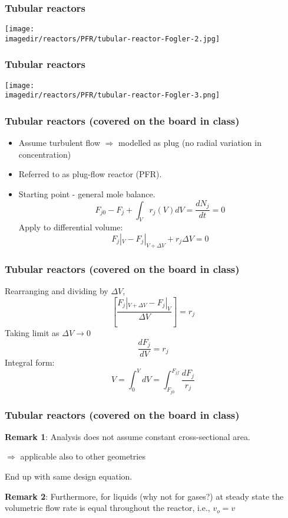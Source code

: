 \begin{frame}\frametitle{Tubular reactors}
	\begin{center}
		\texttt{[image: \\imagedir/reactors/PFR/tubular-reactor-Fogler-2.jpg]}
	\end{center}
\end{frame}

\begin{frame}\frametitle{Tubular reactors}
	\begin{center}
		\texttt{[image: \\imagedir/reactors/PFR/tubular-reactor-Fogler-3.png]}
	\end{center}
\end{frame}

\begin{frame}\frametitle{Tubular reactors (covered on the board in class)}
	\vspace{-0.5em}
	\begin{itemize}
		\item	Assume turbulent flow $\Rightarrow$ modelled as plug (no radial variation in concentration)
		\item	Referred to as plug-flow reactor (PFR).
		\item	Starting point - general mole balance. $$F_{j0} - F_j + \int_Vr_j(V)dV = \frac{dN_j}{dt} = 0$$ Apply to differential volume: $$F_j|_V - F_j|_{V + \Delta V} + r_j\Delta V = 0$$
	\end{itemize}
\end{frame}

\begin{frame}\frametitle{Tubular reactors (covered on the board in class)}
	Rearranging and dividing by $\Delta V$, $$\left[\frac{F_j|_{V+\Delta V} - F_j|_V}{\Delta V}\right] = r_j$$ Taking limit as $\Delta V \rightarrow 0$ $$\boxed{\frac{dF_j}{dV} = r_j}$$ Integral form: $$V = \int_0^{V}dV = \int_{F_{j0}}^{F_{jf}}\frac{dF_j}{r_j}$$
\end{frame}

\begin{frame}\frametitle{Tubular reactors (covered on the board in class)}
	\textbf{Remark 1}: Analysis does not assume constant cross-sectional area.

	$\Rightarrow$ applicable also to other geometries

	End up with same design equation.

	\vspace{24pt}

	\textbf{Remark 2}: Furthermore, for liquids (why not for gases?) at steady state the volumetric flow rate is equal throughout the reactor, i.e., $v_o=v$
\end{frame}

